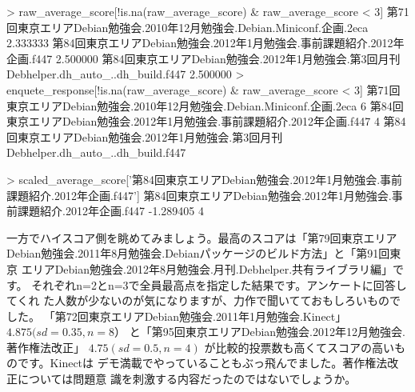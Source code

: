 \documentclass[mingoth,a4paper]{jsarticle}
\begin{document}
\begin{commandline}
> raw_average_score[!is.na(raw_average_score) & raw_average_score < 3]
                第71回東京エリアDebian勉強会.2010年12月勉強会.Debian.Miniconf.企画.2eca 
                                                                               2.333333 
              第84回東京エリアDebian勉強会.2012年1月勉強会.事前課題紹介.2012年企画.f447 
                                                                               2.500000 
第84回東京エリアDebian勉強会.2012年1月勉強会.第3回月刊Debhelper.dh_auto_..dh_build.f447 
                                                                               2.500000 
> enquete_response[!is.na(raw_average_score) & raw_average_score < 3]
                第71回東京エリアDebian勉強会.2010年12月勉強会.Debian.Miniconf.企画.2eca 
                                                                                      6 
              第84回東京エリアDebian勉強会.2012年1月勉強会.事前課題紹介.2012年企画.f447 
                                                                                      4 
第84回東京エリアDebian勉強会.2012年1月勉強会.第3回月刊Debhelper.dh_auto_..dh_build.f447 

> scaled_average_score['第84回東京エリアDebian勉強会.2012年1月勉強会.事前課題紹介.2012年企画.f447']
第84回東京エリアDebian勉強会.2012年1月勉強会.事前課題紹介.2012年企画.f447 
                                                                -1.289405 
                                                                                      4 
\end{commandline}

一方でハイスコア側を眺めてみましょう。最高のスコアは「第79回東京エリア
Debian勉強会.2011年8月勉強会.Debianパッケージのビルド方法」と「第91回東京
エリアDebian勉強会.2012年8月勉強会.月刊.Debhelper.共有ライブラリ編」です。
それぞれn=2とn=3で全員最高点を指定した結果です。アンケートに回答してくれ
た人数が少ないのが気になりますが、力作で聞いてておもしろいものでした。
「第72回東京エリアDebian勉強会.2011年1月勉強会.Kinect」$ 4.875 (sd=0.35,
n=8）$ と「第95回東京エリアDebian勉強会.2012年12月勉強会.著作権法改正」
$4.75 (sd=0.5, n=4)$ が比較的投票数も高くてスコアの高いものです。Kinectは
デモ満載でやっていることもぶっ飛んでました。著作権法改正については問題意
識を刺激する内容だったのではないでしょうか。
\end{document}
